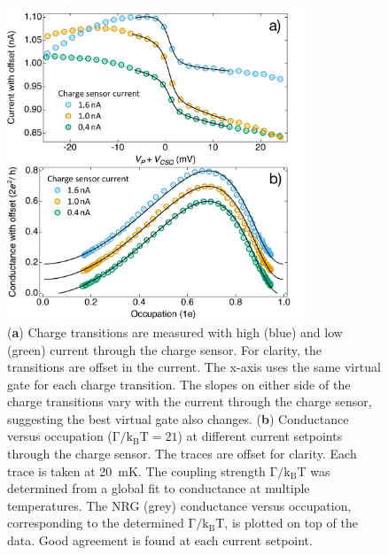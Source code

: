 \begin{figure}[!bht]
 \begin{center}
 \includegraphics[width=0.8\textwidth]{figures/ch3/figure17.pdf}
 \caption[Conductance versus Occupation : Varying Charge Sensor Current]{\label{fig:ch3/cond_occ_QPC_vs_ct} 
 (\textbf{a}) Charge transitions are measured with high (blue) and low (green) current through the charge sensor. For clarity, the transitions are offset in the current. The x-axis uses the same virtual gate for each charge transition. The slopes on either side of the charge transitions vary with the current through the charge sensor, suggesting the best virtual gate also changes. (\textbf{b}) Conductance versus occupation ($\mathrm{\Gamma/k_BT=21}$) at different current setpoints through the charge sensor. The traces are offset for clarity. Each trace is taken at \qty{20}{mK}. The coupling strength $\mathrm{\Gamma/k_BT}$ was determined from a global fit to conductance at multiple temperatures. The NRG (grey) conductance versus occupation, corresponding to the determined $\mathrm{\Gamma/k_BT}$, is plotted on top of the data. Good agreement is found at each current setpoint.}
 \end{center}
\end{figure}


